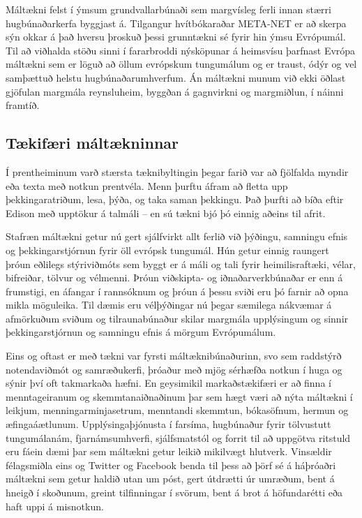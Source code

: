 \documentclass{../../metanetpaper}
\begin{document}
\begin{multicols}{2}
Máltækni felst í ýmsum grundvallarbúnaði sem margvísleg ferli innan stærri hugbúnaðarkerfa byggjast á. Tilgangur hvítbókaraðar META-NET er að skerpa sýn okkar á það hversu þroskuð þessi grunntækni sé fyrir hin ýmsu Evrópumál. Til að viðhalda stöðu sinni í fararbroddi nýsköpunar á heimsvísu þarfnast Evrópa máltækni sem er löguð að öllum evrópskum tungumálum og er traust, ódýr og vel samþættuð helstu hugbúnaðarumhverfum. Án máltækni munum við ekki öðlast gjöfulan margmála reynsluheim, byggðan á gagnvirkni og margmiðlun, í náinni framtíð. 

\subsection{Tækifæri máltækninnar}

Í prentheiminum varð stærsta tæknibyltingin þegar farið var að fjölfalda myndir eða texta með notkun prentvéla. Menn þurftu áfram að fletta upp þekkingaratriðum, lesa, þýða, og taka saman þekkingu. Það þurfti að bíða eftir Edison með upptökur á talmáli -- en sú tækni bjó þó einnig aðeins til afrit.

Stafræn máltækni getur nú gert sjálfvirkt allt ferlið við þýðingu, samningu efnis og þekkingarstjórnun fyrir öll evrópsk tungumál. Hún getur einnig raungert þróun eðlilegs stýriviðmóts sem byggt er á máli og tali fyrir heimilisraftæki, vélar, bifreiðar, tölvur og vélmenni. Þróun viðskipta- og iðnaðarverkbúnaðar er enn á frumstigi, en áfangar í rannsóknum og þróun á þessu sviði eru þó farnir að opna mikla möguleika. Til dæmis eru vélþýðingar nú þegar sæmilega nákvæmar á afmörkuðum sviðum og tilraunabúnaður skilar margmála upplýsingum og sinnir þekkingarstjórnun og samningu efnis á mörgum Evrópumálum.

Eins og oftast er með tækni var fyrsti máltæknibúnaðurinn, svo sem raddstýrð notendaviðmót og samræðukerfi, þróaður með mjög sérhæfða notkun í huga og sýnir því oft takmarkaða hæfni. En geysimikil markaðstækifæri er að finna í menntageiranum og skemmtanaiðnaðinum þar sem hægt væri að nýta máltækni í leikjum, menningarminjasetrum, menntandi skemmtun, bókasöfnum, hermun og æfingaáætlunum. Upplýsingaþjónusta í farsíma, hugbúnaður fyrir tölvustutt tungumálanám, fjarnámsumhverfi, sjálfsmatstól og forrit til að uppgötva ritstuld eru fáein dæmi þar sem máltækni getur leikið mikilvægt hlutverk. Vinsældir félagsmiðla eins og Twitter og Facebook benda til þess að þörf sé á háþróaðri máltækni sem getur haldið utan um póst, gert útdrætti úr umræðum, bent á hneigð í skoðunum, greint tilfinningar í svörum, bent á brot á höfundarétti eða haft uppi á misnotkun.


\end{multicols}
\end{document}
